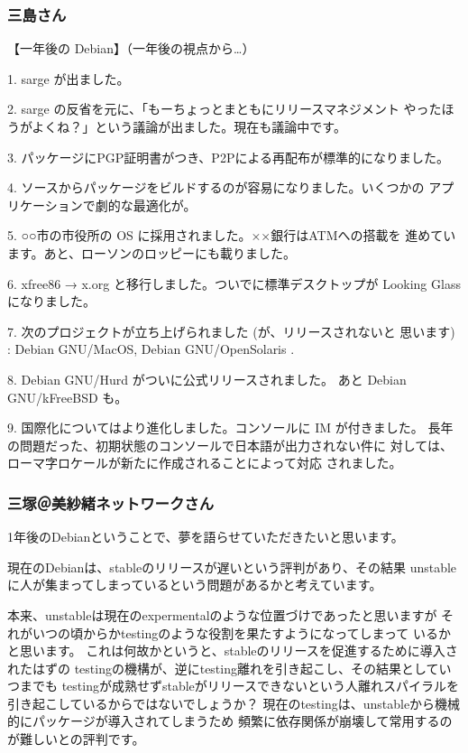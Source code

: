 \documentclass[mingoth]{jsarticle}
\begin{document}
\subsubsection{三島さん}

【一年後の Debian】（一年後の視点から…）

1. sarge が出ました。

2. sarge の反省を元に、「もーちょっとまともにリリースマネジメント
   やったほうがよくね？」という議論が出ました。現在も議論中です。

3. パッケージにPGP証明書がつき、P2Pによる再配布が標準的になりました。

4. ソースからパッケージをビルドするのが容易になりました。いくつかの
   アプリケーションで劇的な最適化が。

5. ○○市の市役所の OS に採用されました。××銀行はATMへの搭載を
   進めています。あと、ローソンのロッピーにも載りました。

6. xfree86 → x.org と移行しました。ついでに標準デスクトップが
   Looking Glass になりました。

7. 次のプロジェクトが立ち上げられました (が、リリースされないと
   思います) : Debian GNU/MacOS, Debian GNU/OpenSolaris .

8. Debian GNU/Hurd がついに公式リリースされました。
   あと Debian GNU/kFreeBSD も。

9. 国際化についてはより進化しました。コンソールに IM が付きました。
   長年の問題だった、初期状態のコンソールで日本語が出力されない件に
   対しては、ローマ字ロケールが新たに作成されることによって対応
   されました。


\subsubsection{三塚＠美紗緒ネットワークさん}

1年後のDebianということで、夢を語らせていただきたいと思います。

現在のDebianは、stableのリリースが遅いという評判があり、その結果
unstableに人が集まってしまっているという問題があるかと考えています。

本来、unstableは現在のexpermentalのような位置づけであったと思いますが
それがいつの頃からかtestingのような役割を果たすようになってしまって
いるかと思います。
これは何故かというと、stableのリリースを促進するために導入されたはずの
testingの機構が、逆にtesting離れを引き起こし、その結果としていつまでも
testingが成熟せずstableがリリースできないという人離れスパイラルを
引き起こしているからではないでしょうか？
現在のtestingは、unstableから機械的にパッケージが導入されてしまうため
頻繁に依存関係が崩壊して常用するのが難しいとの評判です。
\end{document}
